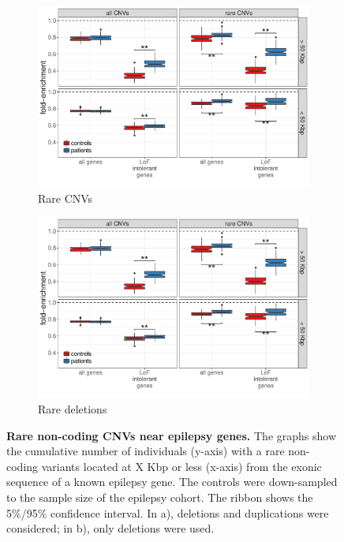 \begin{figure}[ht]
  \centering
  \begin{subfigure}[b]{.7\textwidth}
    \includegraphics[width=\linewidth, page=6]{figures/epilepsy-enrichmentPatterns.pdf}
    \caption{Rare CNVs}
    \label{fig:epidistnc}
  \end{subfigure}
  \begin{subfigure}[b]{.7\textwidth}
    \includegraphics[width=\linewidth, page=7]{figures/epilepsy-enrichmentPatterns.pdf}
    \caption{Rare deletions}
    \label{fig:epidistncdel}
  \end{subfigure}
  \caption[Rare non-coding CNVs near epilepsy genes.]{{\bf Rare non-coding CNVs near epilepsy genes.} {\small The graphs show the cumulative number of individuals (y-axis) with a rare non-coding variants located at X Kbp or less (x-axis) from the exonic sequence of a known epilepsy gene. The controls were down-sampled to the sample size of the epilepsy cohort. The ribbon shows the 5\%/95\% confidence interval. In a), deletions and duplications were considered; in b), only deletions were used.}}
\end{figure}

